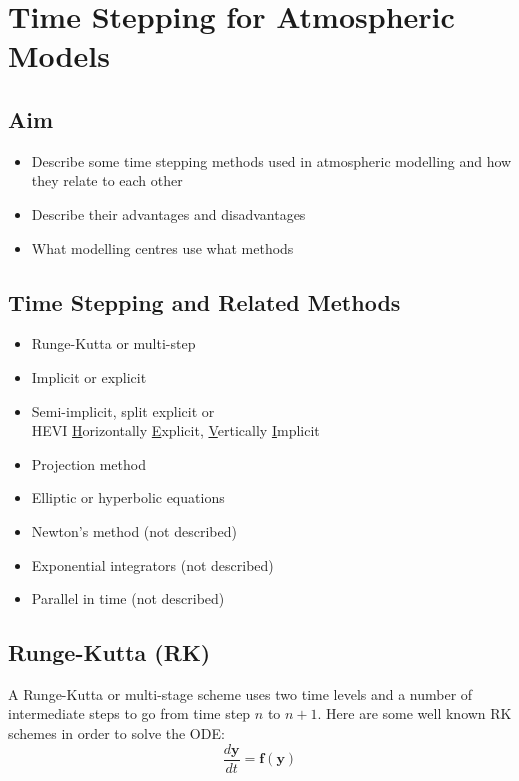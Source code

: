 
\chapter{Time Stepping for Atmospheric Models}

\section*{Aim}
\begin{itemize}
\item Describe some time stepping methods used in atmospheric modelling
and how they relate to each other
\item Describe their advantages and disadvantages
\item What modelling centres use what methods
\end{itemize}

\section*{Time Stepping and Related Methods}

\begin{multicols}{2}
\begin{itemize}
\item Runge-Kutta or multi-step
\item Implicit or explicit
\item Semi-implicit, split explicit or \\
HEVI \textendash{}\uline{ H}orizontally \uline{E}xplicit, \uline{V}ertically
\uline{I}mplicit
\item Projection method
\item Elliptic or hyperbolic equations
\item Newton's method (not described)
\item Exponential integrators (not described)
\item Parallel in time (not described)
\end{itemize}
\end{multicols}

\clearpage{}

\section{Runge-Kutta (RK)}

A Runge-Kutta or multi-stage scheme uses two time levels and a number
of intermediate steps to go from time step $n$ to $n+1$. Here are
some well known RK schemes in order to solve the ODE:
\[
{\displaystyle \frac{d\mathbf{y}}{dt}=\mathbf{f}(\mathbf{y})}
\]


